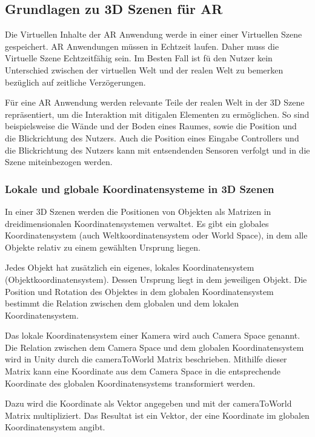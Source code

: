 \subsection{Grundlagen zu 3D Szenen für AR}


Die Virtuellen Inhalte der AR Anwendung werde in einer einer Virtuellen Szene gespeichert. 
AR Anwendungen müssen in Echtzeit laufen. Daher muss die Virtuelle Szene Echtzeitfähig sein.
Im Besten Fall ist fü den Nutzer kein Unterschied zwischen der virtuellen Welt und der realen Welt zu bemerken bezüglich auf zeitliche Verzögerungen.

Für eine AR Anwendung werden relevante Teile der realen Welt in der 3D Szene repräsentiert, um die Interaktion mit ditigalen Elementen zu ermöglichen.
So sind beispielsweise die Wände und der Boden eines Raumes, sowie die Position und die Blickrichtung des Nutzers. Auch die Position eines Eingabe Controllers und die Blickrichtung des Nutzers kann mit entsendenden Sensoren verfolgt und in die Szene miteinbezogen werden.

\subsubsection{Lokale und globale Koordinatensysteme in 3D Szenen}
In einer 3D Szenen werden die Positionen von Objekten als Matrizen in dreidimensionalen Koordinatensystemen verwaltet.
Es gibt ein globales Koordinatensystem (auch Weltkoordinatensystem oder World Space), in dem alle Objekte relativ zu einem gewählten Ursprung liegen. 

Jedes Objekt hat zusätzlich ein eigenes, lokales Koordinatensystem (Objektkoordinatensystem). Dessen Ursprung liegt in dem jeweiligen Objekt.
Die Position und Rotation des Objektes in dem globalen Koordinatensystem bestimmt die Relation zwischen dem globalen und dem lokalen Koordinatensystem. 

Das lokale Koordinatensystem einer Kamera wird auch Camera Space genannt. Die Relation zwischen dem Camera Space und dem globalen Koordinatensystem wird in Unity durch die cameraToWorld Matrix beschrieben. Mithilfe dieser Matrix kann eine Koordinate aus dem Camera Space in die entsprechende Koordinate des globalen Koordinatensystems transformiert werden.\citep{unitycameratoworldmatrix}

Dazu wird die Koordinate als Vektor angegeben und mit der cameraToWorld Matrix multipliziert. Das Resultat ist ein Vektor, der eine Koordinate im globalen Koordinatensystem angibt.\citep{unitycameratoworldmatrix,unitymultiplyoint}

